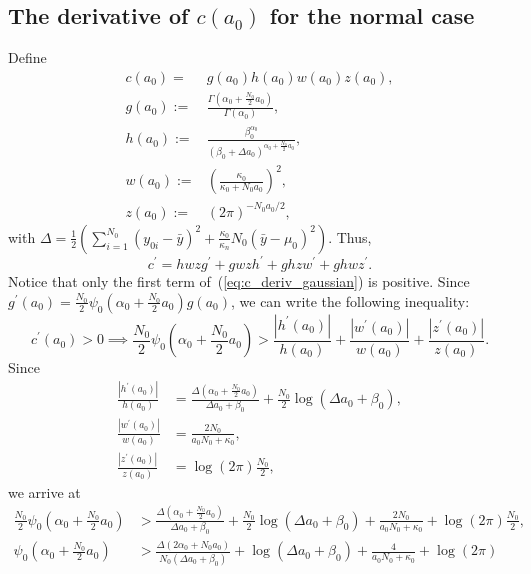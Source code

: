 \documentclass[a4paper, notitlepage, 11pt]{article}
\begin{document}
\subsection*{The derivative of $c(a_0)$ for the normal case}
Define
\begin{align*}
 c(a_0) =& g(a_0)h(a_0)w(a_0)z(a_0), \\
 g(a_0) :=&  \frac{\Gamma\left( \alpha_0 + \frac{N_0}{2}a_0 \right)}{\Gamma(\alpha_0)}, \\
 h(a_0) :=& \frac{\beta_0^{\alpha_0}}{ \left(  \beta_0 + \Delta a_0\right)^{\alpha_0 + \frac{N_0}{2}a_0}}, \\
 w(a_0) :=& \left(\frac{\kappa_0}{\kappa_0 + N_0 a_0} \right)^2 , \\
 z(a_0) :=& (2\pi)^{-N_0 a_0/2}, 
\end{align*}
with $\Delta =  \frac{1}{2}\left( \sum_{i=1}^{N_0}(y_{0i}-\bar{y})^2 + \frac{\kappa_0}{\kappa_n} N_0 (\bar{y}-\mu_0)^2 \right)$.
Thus,
\begin{equation}
\label{eq:c_deriv_gaussian}
 c^\prime = h w z g^\prime + g w z h^\prime + g h z w^\prime + g h w z^\prime.
\end{equation}
Notice that only the first term of~(\ref{eq:c_deriv_gaussian}) is positive.
Since $g^\prime(a_0) = \frac{N_0}{2} \psi_0\left( \alpha_0 +  \frac{N_0}{2} a_0 \right)g(a_0)$, we can write the following inequality:
\begin{equation}
 c^\prime(a_0) > 0 \implies \frac{N_0}{2} \psi_0\left( \alpha_0 +  \frac{N_0}{2} a_0 \right) > \frac{|h^\prime(a_0)|}{h(a_0)} + \frac{|w^\prime(a_0)|}{w(a_0)} + \frac{|z^\prime(a_0)|}{z(a_0)}.
\end{equation}
Since
\begin{align}
 \frac{|h^\prime(a_0)|}{h(a_0)}  &=  \frac{\Delta\left( \alpha_0 + \frac{N_0}{2} a_0 \right) }{\Delta a_0 + \beta_0} + \frac{N_0}{2}\log{\left( \Delta a_0+ \beta_0 \right) }, \\
 \frac{|w^\prime(a_0)|}{w(a_0)}  &= \frac{2N_0}{a_0N_0+\kappa_0},\\
\frac{|z^\prime(a_0)|}{z(a_0)}  &= \log(2\pi) \frac{N_0}{2},
\end{align}
we arrive at
\begin{align}
 \frac{N_0}{2} \psi_0\left( \alpha_0 +  \frac{N_0}{2} a_0 \right) &>  \frac{\Delta\left( \alpha_0 + \frac{N_0}{2} a_0 \right) }{\Delta a_0 + \beta_0} + \frac{N_0}{2}\log{\left( \Delta a_0+ \beta_0 \right) } + \frac{2N_0}{a_0N_0+\kappa_0} + \log(2\pi) \frac{N_0}{2}, \\
\psi_0\left( \alpha_0 +  \frac{N_0}{2} a_0 \right) &>  \frac{\Delta\left( 2\alpha_0 + N_0a_0 \right) }{N_0\left(\Delta a_0 + \beta_0\right)} + \log{\left( \Delta a_0+ \beta_0 \right) } + \frac{4}{a_0N_0+\kappa_0} + \log(2\pi)
\end{align}
\end{document}
